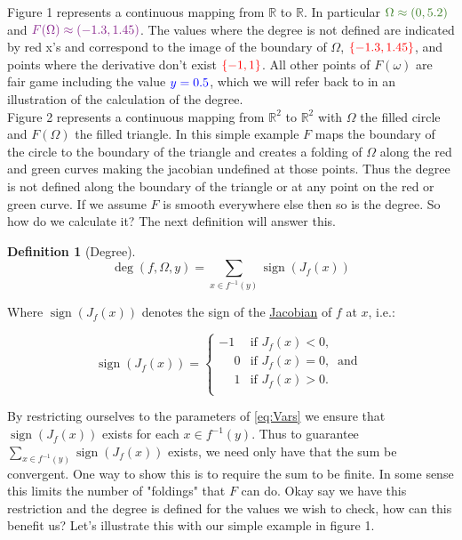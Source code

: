 \documentclass[11pt]{article}
\theoremstyle{plain}
\theoremstyle{definition}
\newtheorem{cdef}{Definition}[section]
\theoremstyle{remark}
\newcommand{\p}{\phantom{-}}
\begin{document}
Figure 1 represents a continuous mapping from $\mathbb{R}$ to $\mathbb{R}$. In particular ${\color{OliveGreen}\Omega\approx(0,5.2)}$ and ${\color{Fuchsia}F(\Omega)\approx(-1.3,1.45)}$. The values where the degree is not defined are indicated by red x's and correspond to the image of the boundary of $\Omega$, ${\color{red}\{-1.3,1.45\}}$, and points where the derivative don't exist ${\color{red}\{-1,1\}}$. All other points of $F(\omega)$ are fair game including the value ${\color{blue}y=0.5}$, which we will refer back to in an illustration of the calculation of the degree.\\
Figure 2 represents a continuous mapping from $\mathbb{R}^2$ to $\mathbb{R}^2$ with $\Omega$ the filled circle and $F(\Omega)$ the filled triangle. In this simple example $F$ maps the boundary of the circle to the boundary of the triangle and creates a folding of $\Omega$ along the red and green curves making the jacobian undefined at those points. Thus the degree is not defined along the boundary of the triangle or at any point on the red or green curve. If we assume $F$ is smooth everywhere else then so is the degree. So how do we calculate it? The next definition will answer this. 


\begin{cdef}[Degree] \ \\
$$\operatorname{deg}\left(f,\Omega,y\right)=\sum\limits_{x\in f^{-1}(y)}\operatorname{sign}\left(J_f(x)\right)$$
\end{cdef}

Where $\operatorname{sign}\left(J_f(x)\right)$ denotes the sign of the \href{https://en.wikipedia.org/wiki/Jacobian_matrix_and_determinant}{Jacobian} of $f$ at $x$, i.e.:

\[\operatorname{sign}\left(J_f(x)\right)=   \left\{
\begin{array}{ll}
      -1   & \mbox{if } J_f(x)< 0, \\
      \p 0 & \mbox{if } J_f(x)= 0,~\mbox{ and } \\
      \p 1 & \mbox{if } J_f(x)> 0. \\
\end{array} 
\right. \]

By restricting ourselves to the parameters of \eqref{eq:Vars} we ensure that $\operatorname{sign}\left(J_f(x)\right)$ exists for each $x\in f^{-1}(y)$.
Thus to guarantee $\sum\limits_{x\in f^{-1}(y)}\operatorname{sign}\left(J_f(x)\right)$ exists, we need only have that the sum be convergent. One way to show this is to require the sum to be finite. In some sense this limits the number of "foldings" that $F$ can do. Okay say we have this restriction and the degree is defined for the values we wish to check, how can this benefit us? Let's illustrate this with our simple example in figure 1.
\end{document}
